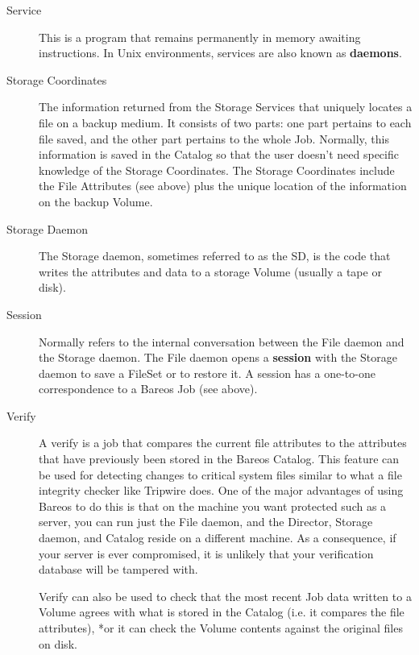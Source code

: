 \begin{description}
\item [Service]
   This is a program that remains permanently in memory awaiting
   instructions.  In Unix environments, services are also known as
   {\bf daemons}.

\item [Storage Coordinates]
   The information returned from the Storage Services that uniquely locates
   a file on a backup medium.  It consists of two parts: one part pertains
   to each file saved, and the other part pertains to the whole Job.
   Normally, this information is saved in the Catalog so that the user
   doesn't need specific knowledge of the Storage Coordinates.  The Storage
   Coordinates include the File Attributes (see above) plus the unique
   location of the information on the backup Volume.

\item [Storage Daemon]
   The Storage daemon, sometimes referred to as the SD, is the code that
   writes the attributes and data to a storage Volume (usually a tape or
   disk).

\item [Session]
   Normally refers to the internal conversation between the File daemon and
   the Storage daemon.  The File daemon opens a {\bf session} with the
   Storage daemon to save a FileSet or to restore it.  A session has a
   one-to-one correspondence to a Bareos Job (see above).

\item [Verify]
   A verify is a job that compares the current file attributes to the
   attributes that have previously been stored in the Bareos Catalog.  This
   feature can be used for detecting changes to critical system files
   similar to what a file integrity checker like Tripwire does.
   One of the major advantages of
   using Bareos to do this is that on the machine you want protected such
   as a server, you can run just the File daemon, and the Director, Storage
   daemon, and Catalog reside on a different machine.  As a consequence, if
   your server is ever compromised, it is unlikely that your verification
   database will be tampered with.

   Verify can also be used to check that the most recent Job data written
   to a Volume agrees with what is stored in the Catalog (i.e.  it compares
   the file attributes), *or it can check the Volume contents against the
   original files on disk.


\end{description}
